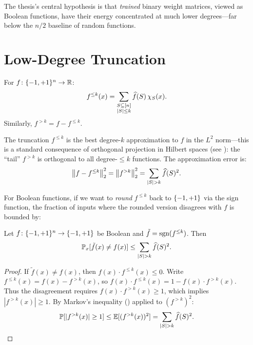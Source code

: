 The thesis's central hypothesis is that \emph{trained} binary weight
matrices, viewed as Boolean functions, have their energy concentrated at
much lower degrees---far below the $n/2$ baseline of random functions.


\section{Low-Degree Truncation}\label{sec:truncation}

\begin{definition}\label{def:truncation}
For $f \colon \{-1,+1\}^n \to \mathbb{R}$:
\[
  f^{\leq k}(x) = \sum_{\substack{S \subseteq [n] \\ |S| \leq k}} \widehat{f}(S)\, \chi_S(x).
\]
Similarly, $f^{>k} = f - f^{\leq k}$.
\end{definition}

The truncation $f^{\leq k}$ is the best degree-$k$ approximation to $f$
in the $L^2$ norm---this is a standard consequence of orthogonal
projection in Hilbert spaces (see \citealp[Chapter~6]{axler2024linear}):
the ``tail'' $f^{>k}$ is orthogonal to all degree-$\leq k$ functions. The
approximation error is:
\begin{equation}\label{eq:truncation-error}
  \left\| f - f^{\leq k} \right\|_2^2 = \left\| f^{>k} \right\|_2^2
  = \sum_{|S| > k} \widehat{f}(S)^2.
\end{equation}

For Boolean functions, if we want to \emph{round} $f^{\leq k}$ back to
$\{-1,+1\}$ via the sign function, the fraction of inputs where the rounded
version disagrees with $f$ is bounded by:

\begin{proposition}\label{prop:sign-rounding}
Let $f \colon \{-1,+1\}^n \to \{-1,+1\}$ be Boolean and
$\tilde{f} = \operatorname{sgn}(f^{\leq k})$. Then
\[
  \mathbb{P}_x[\tilde{f}(x) \neq f(x)] \leq \sum_{|S| > k} \widehat{f}(S)^2.
\]
\end{proposition}

\begin{proof}
If $\tilde{f}(x) \neq f(x)$, then $f(x) \cdot f^{\leq k}(x) \leq 0$.
Write $f^{\leq k}(x) = f(x) - f^{>k}(x)$, so
$f(x) \cdot f^{\leq k}(x) = 1 - f(x) \cdot f^{>k}(x)$.
Thus the disagreement requires $f(x) \cdot f^{>k}(x) \geq 1$, which
implies $|f^{>k}(x)| \geq 1$. By Markov's inequality
() applied to $(f^{>k})^2$:
\[
  \Prob[|f^{>k}(x)| \geq 1] \leq \E[(f^{>k}(x))^2] = \sum_{|S|>k} \fhat(S)^2.
  \qedhere
\]
\end{proof}

